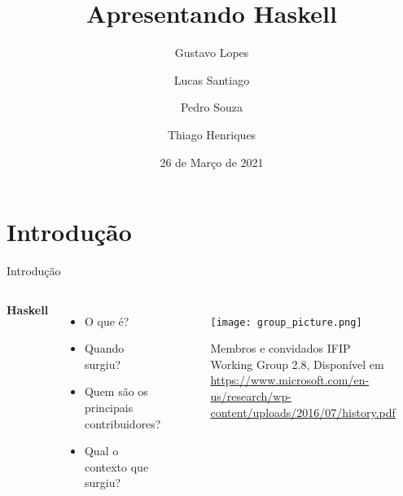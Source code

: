 \documentclass[aspectratio=169]{beamer}
\title{Apresentando Haskell}
\author{Gustavo Lopes \and Lucas Santiago \and Pedro Souza \and Thiago Henriques }
\institute{Pontifícia Universidade Católica de Minas Gerais}
\date{26 de Março de 2021}
\begin{document}



    \section{Introdução}

    \begin{frame}{Introdução}
     
        \begin{columns}
          \textbf{Haskell} 
  
          \begin{itemize}
            \item O que é?
            \item Quando surgiu?
            \item Quem são os principais contribuidores?
            \item Qual o contexto que surgiu?
             
          \end{itemize}

  
          \begin{figure}  
          \texttt{[image: group\_picture.png]}
          \caption{\centering Membros e convidados IFIP Working Group 2.8, Disponível em \url{https://www.microsoft.com/en-us/research/wp-content/uploads/2016/07/history.pdf}}
          \end{figure}

        \end{columns}

    \end{frame}
\end{document}
